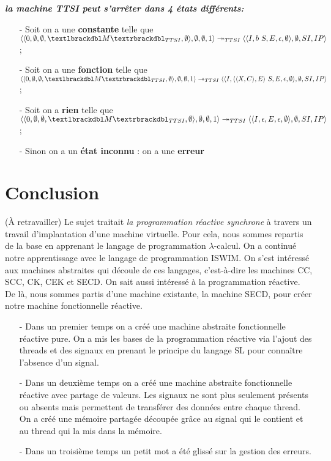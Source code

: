 \documentclass[10pt,a4paper]{report}
\begin{document}
	
	\textbf{\textit{la machine TTSI peut s'arrêter dans 4 états différents:}}
	\smallbreak
	\begin{itemize}
		\item[] - Soit on a une \textbf{constante} telle que 
		$\langle\langle 0,\emptyset,\emptyset,\textlbrackdbl M\textrbrackdbl_{TTSI},\emptyset\rangle,\emptyset,\emptyset,1\rangle 
		\twoheadrightarrow_{TTSI} 
		\langle\langle I,b~S,E,\epsilon,\emptyset\rangle,\emptyset,SI,IP\rangle$;
		\item[] 
		\item[] - Soit on a une \textbf{fonction} telle que
		$\langle\langle 0,\emptyset,\emptyset,\textlbrackdbl M\textrbrackdbl_{TTSI},\emptyset\rangle,\emptyset,\emptyset,1\rangle 
		\twoheadrightarrow_{TTSI} 
		\langle\langle I,\langle\langle X,C\rangle,E\rangle~S,E,\epsilon,\emptyset\rangle,\emptyset,SI,IP\rangle$;
		\item[] 
		\item[] - Soit on a \textbf{rien} telle que  
		$\langle\langle 0,\emptyset,\emptyset,\textlbrackdbl M\textrbrackdbl_{TTSI},\emptyset\rangle,\emptyset,\emptyset,1\rangle 
		\twoheadrightarrow_{TTSI} 
		\langle\langle I,\epsilon,E,\epsilon,\emptyset\rangle,\emptyset,SI,IP\rangle$;
		\item[]
		\item[] - Sinon on a un \textbf{état inconnu} : on a une \textbf{erreur} 
	\end{itemize}
	\bigbreak
	
	
	
	\chapter{Conclusion}
	
	(À retravailler)
	Le sujet traitait \textit{la programmation réactive synchrone} à travers un travail d'implantation d'une machine virtuelle. Pour cela, nous sommes repartis de la base en apprenant le langage de programmation $\lambda$-calcul. On a continué notre apprentissage avec le langage de programmation ISWIM. On s'est intéressé aux machines abstraites qui découle de ces langages, c'est-à-dire les machines CC, SCC, CK, CEK et SECD. On sait aussi intéressé à la programmation réactive. De là, nous sommes partis d'une machine existante, la machine SECD, pour créer notre machine fonctionnelle réactive.
	\begin{itemize}
		\item[-] Dans un premier temps on a créé une machine abstraite fonctionnelle réactive pure. On a mis les bases de la programmation réactive via l'ajout des threads et des signaux en prenant le principe du langage SL pour connaître l'absence d'un signal. 
		\item[-]Dans un deuxième temps on a créé une machine abstraite fonctionnelle réactive avec partage de valeurs. Les signaux ne sont plus seulement présents ou absents mais permettent de transférer des données entre chaque thread. On a créé une mémoire partagée découpée grâce au signal qui le contient et au thread qui la mis dans la mémoire.
		\item[-] Dans un troisième temps un petit mot a été glissé sur la gestion des erreurs. 
	\end{itemize}
	\medbreak
	
\end{document}
